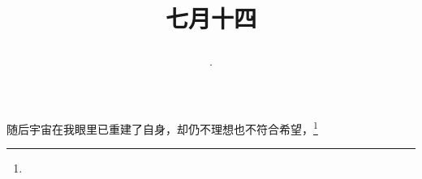 \title{\date[d=17,m=8,y=2024][year:cn-y,年,month:cn,day:cn,日,·,weekday]·七月十四 }
随后宇宙在我眼里已重建了自身，却仍不理想也不符合希望，\footnote{ }

